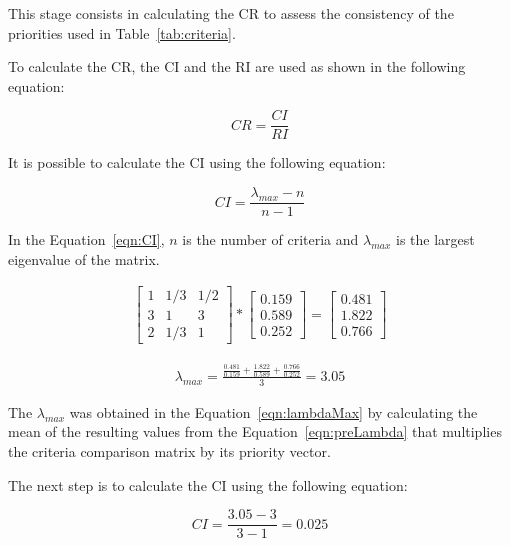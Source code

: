 This stage consists in calculating the \gls{CR} to assess the consistency of the priorities used in Table~\ref{tab:criteria}.

To calculate the \gls{CR}, the \gls{CI} and the \gls{RI} are used as shown in the following equation:

\begin{equation}
    CR = \frac{CI}{RI}
\end{equation}

It is possible to calculate the \gls{CI} using the following equation:

\begin{equation}
    \label{eqn:CI}
    CI = \frac{\lambda_{max}-n}{n-1}
\end{equation}

In the Equation~\ref{eqn:CI}, $n$ is the number of criteria and $\lambda_{max}$ is the largest eigenvalue of the matrix.

\begin{gather}
    \label{eqn:preLambda}
    \begin{bmatrix}
        1 & 1/3 & 1/2 \\
        3 & 1 & 3 \\
        2 & 1/3 & 1
    \end{bmatrix}
    *
    \begin{bmatrix}
      0.159 \\
      0.589 \\
      0.252
    \end{bmatrix}
      =
    \begin{bmatrix}
      0.481 \\
      1.822 \\
      0.766
    \end{bmatrix}
\end{gather}


\begin{gather}
    \label{eqn:lambdaMax}
    \lambda_{max} =
    \frac{\frac{0.481}{0.159} + \frac{1.822}{0.589} + \frac{0.766}{0.252}}{3}
    = 3.05
\end{gather}

The $\lambda_{max}$ was obtained in the Equation~\ref{eqn:lambdaMax} by calculating the mean of the resulting values from the Equation~\ref{eqn:preLambda} that multiplies the criteria comparison matrix by its priority vector.

The next step is to calculate the \gls{CI} using the following equation:

\begin{equation}
    CI = \frac{3.05-3}{3-1} = 0.025
\end{equation}

